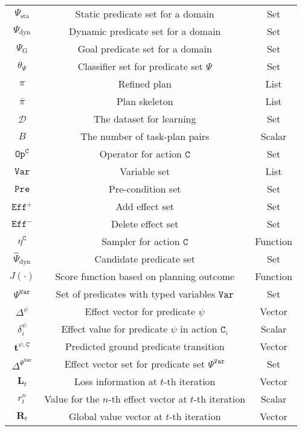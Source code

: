 \begin{table}[!t]
\begin{tabular}{ccc}
        $\Psi_\mathrm{sta}$ & Static predicate set for a domain & Set \\
        $\Psi_\mathrm{dyn}$ & Dynamic predicate set for a domain & Set \\
        $\Psi_\mathrm{G}$ & Goal predicate set for a domain & Set \\
        $\theta_\Psi$ & Classifier set for predicate set $\Psi$ & Set \\
        $\pi$ & Refined plan & List \\
        $\bar{\pi}$ & Plan skeleton & List \\
        $\mathcal{D}$ & The dataset for learning & Set \\
        $B$ & The number of task-plan pairs & Scalar \\
        $\mathtt{Op}^\mathtt{C}$ & Operator for action $\mathtt{C}$ & Set \\
        $\mathtt{Var}$ & Variable set & List \\
        $\mathtt{Pre}$ & Pre-condition set & Set \\
        $\mathtt{Eff}^+$ & Add effect set & Set \\
        $\mathtt{Eff}^-$ & Delete effect set & Set \\
        $\eta^\mathtt{C}$ & Sampler for action $\mathtt{C}$ & Function \\
        $\hat{\Psi}_\mathrm{dyn}$ & Candidate predicate set & Set \\
        $J(\cdot)$ & Score function based on planning outcome & Function \\
        $\Psi^\mathtt{Var}$ & Set of predicates with typed variables $\mathtt{Var}$ & Set \\
        $\Delta^\psi$ & Effect vector for predicate $\psi$ & Vector \\
        $\delta^\psi_i$ & Effect value for predicate $\psi$ in action $\mathtt{C}_i$& Scalar \\
        $\bm{t}^{\psi, \underline{\mathtt{C}}}$ & Predicted ground predicate transition & Vector \\
        $\Delta^{\Psi^\mathtt{Var}}$ & Effect vector set for predicate set $\Psi^\mathtt{Var}$ & Set \\
        $\mathbf{L}_t$ & Loss information at $t$-th iteration & Vector \\
        $r^n_t$ & Value for the $n$-th effect vector at $t$-th iteration & Scalar \\
        $\mathbf{R}_t$ & Global value vector at $t$-th iteration & Vector \\
        \bottomrule[1.5pt]
    \end{tabular}%
    \label{tab:notation}%
    \vspace{-0.3cm}
\end{table}%

